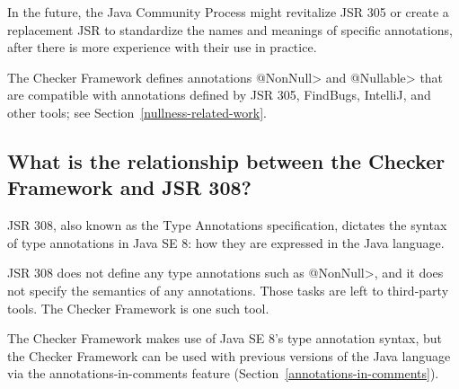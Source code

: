 In the future, the Java Community Process might revitalize JSR 305 or
create a replacement JSR to standardize the names and
meanings of specific annotations, after there is more experience with their
use in practice.



The Checker Framework defines annotations \<@NonNull> and \<@Nullable> that
are compatible with annotations defined by JSR 305, FindBugs, IntelliJ, and
other tools; see Section~\ref{nullness-related-work}.


\subsection{What is the relationship between the Checker Framework and JSR 308?\label{faq-jsr-308}}

JSR 308, also known as the Type Annotations specification, dictates the
syntax of type annotations in Java SE 8:  how they are expressed in the
Java language.

JSR 308 does not define any type annotations such as \<@NonNull>, and it does
not specify the semantics of any annotations.  Those tasks are left to
third-party tools.  The Checker Framework is one such tool.

The Checker Framework makes use of Java SE 8's type annotation syntax, but
the Checker Framework can
be used with previous versions of the Java language via the
annotations-in-comments feature (Section~\ref{annotations-in-comments}).


